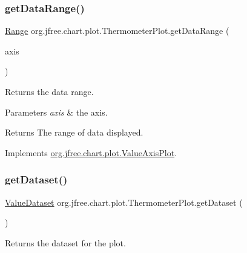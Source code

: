 \subsubsection{\texorpdfstring{get\+Data\+Range()}{getDataRange()}}
{\footnotesize\ttfamily \mbox{\hyperlink{classorg_1_1jfree_1_1data_1_1_range}{Range}} org.\+jfree.\+chart.\+plot.\+Thermometer\+Plot.\+get\+Data\+Range (\begin{DoxyParamCaption}\item[{\mbox{\hyperlink{classorg_1_1jfree_1_1chart_1_1axis_1_1_value_axis}{Value\+Axis}}}]{axis }\end{DoxyParamCaption})}

Returns the data range.


\begin{DoxyParams}{Parameters}
{\em axis} & the axis.\\
\hline
\end{DoxyParams}
\begin{DoxyReturn}{Returns}
The range of data displayed. 
\end{DoxyReturn}


Implements \mbox{\hyperlink{interfaceorg_1_1jfree_1_1chart_1_1plot_1_1_value_axis_plot_a54815b2f078c11b2618804fe3e7e5353}{org.\+jfree.\+chart.\+plot.\+Value\+Axis\+Plot}}.

\mbox{\label{classorg_1_1jfree_1_1chart_1_1plot_1_1_thermometer_plot_a5208b3720ee7fcb6980a49f2cce81bf3}} 
\subsubsection{\texorpdfstring{get\+Dataset()}{getDataset()}}
{\footnotesize\ttfamily \mbox{\hyperlink{interfaceorg_1_1jfree_1_1data_1_1general_1_1_value_dataset}{Value\+Dataset}} org.\+jfree.\+chart.\+plot.\+Thermometer\+Plot.\+get\+Dataset (\begin{DoxyParamCaption}{ }\end{DoxyParamCaption})}

Returns the dataset for the plot.

